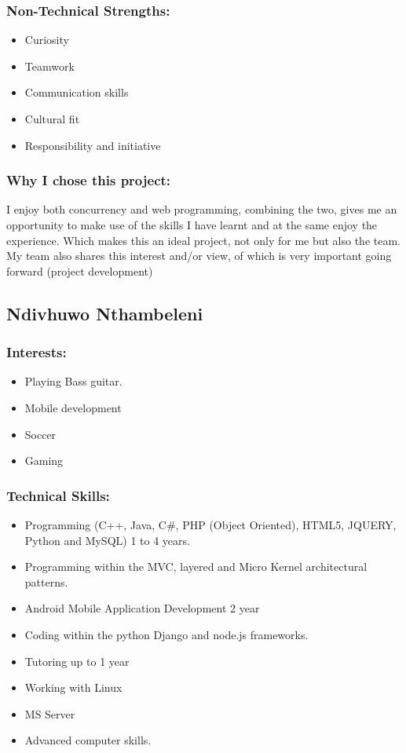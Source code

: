\subsubsection{Non-Technical Strengths:}
\begin{itemize}
		\item Curiosity
		\item Teamwork
		\item Communication skills
		\item Cultural fit
		\item Responsibility and initiative
	\end{itemize}
\subsubsection{Why I chose this project:}
\par{I enjoy both concurrency and web programming, combining the two, gives me an opportunity to make use of the skills I have learnt and at the same enjoy the experience. Which makes this an ideal project, not only for me but also the team. My team also shares this interest and/or view, of which is very important going forward (project development)
}
\newpage
\subsection{Ndivhuwo Nthambeleni}

\subsubsection{Interests:}
\begin{itemize}
		\item Playing Bass guitar.
		\item Mobile development
		\item Soccer
		\item Gaming
	\end{itemize}

\subsubsection{Technical Skills:}
\begin{itemize}
		\item Programming (C++, Java, C\#, PHP (Object Oriented), HTML5, JQUERY, Python and MySQL) 1 to 4 years.
		\item Programming within the MVC, layered and Micro Kernel architectural patterns.
		\item Android Mobile Application Development 2 year
		\item Coding within the python Django and node.js frameworks.
		\item Tutoring up to 1 year
		\item Working with Linux 
		\item MS Server
		\item Advanced computer skills.
	\end{itemize}

